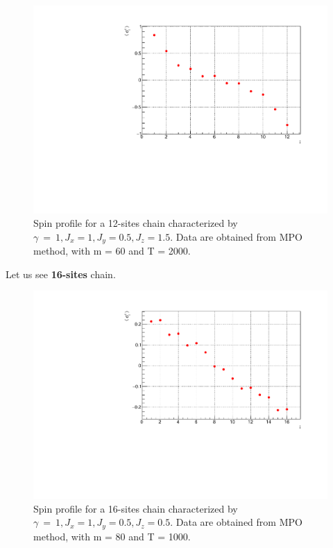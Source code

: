 \begin{figure}[H]
    \centering
    \includegraphics[scale=0.7]{Figures/12sites/LML012m060Time002000_J10515.pdf}
    \caption{Spin profile for a 12-sites chain characterized by $\gamma~=~1, J_x=1, J_y=0.5, J_z=1.5$. Data are obtained from MPO method, with m = 60 and T = 2000.}
    \label{fig:my_label}
\end{figure}

Let us see \textbf{16-sites} chain.

\begin{figure}[H]
    \centering
    \includegraphics[scale=0.7]{Figures/16sites/LML016m080Time001000_J10505.pdf}
    \caption{Spin profile for a 16-sites chain characterized by $\gamma~=~1, J_x=1, J_y=0.5, J_z=0.5$. Data are obtained from MPO method, with m = 80 and T = 1000.}
    \label{fig:my_label}
\end{figure}

